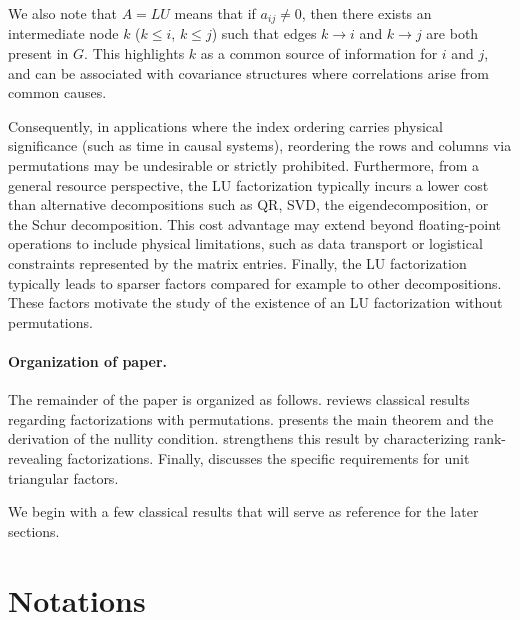 \documentclass{article}
\begin{document}
We also note that $A = LU$ means that if $a_{ij} \neq 0$, then there exists an intermediate node $k$ ($k \le i$, $k \le j$) such that edges $k \to i$ and $k \to j$ are both present in $G$. This highlights $k$ as a common source of information for $i$ and $j$, and can be associated with covariance structures where correlations arise from common causes.

Consequently, in applications where the index ordering carries physical significance (such as time in causal systems), reordering the rows and columns via permutations may be undesirable or strictly prohibited. Furthermore, from a general resource perspective, the LU factorization typically incurs a lower cost than alternative decompositions such as QR, SVD, the eigendecomposition, or the Schur decomposition. This cost advantage may extend beyond floating-point operations to include physical limitations, such as data transport or logistical constraints represented by the matrix entries. Finally, the LU factorization typically leads to sparser factors compared for example to other decompositions. These factors motivate the study of the existence of an LU factorization without permutations.

\paragraph{Organization of paper.}
The remainder of the paper is organized as follows.  reviews classical results regarding factorizations with permutations.  presents the main theorem and the derivation of the nullity condition.  strengthens this result by characterizing rank-revealing factorizations. Finally,  discusses the specific requirements for unit triangular factors.

We begin with a few classical results that will serve as reference for the later sections.

\section*{Notations}
\end{document}
